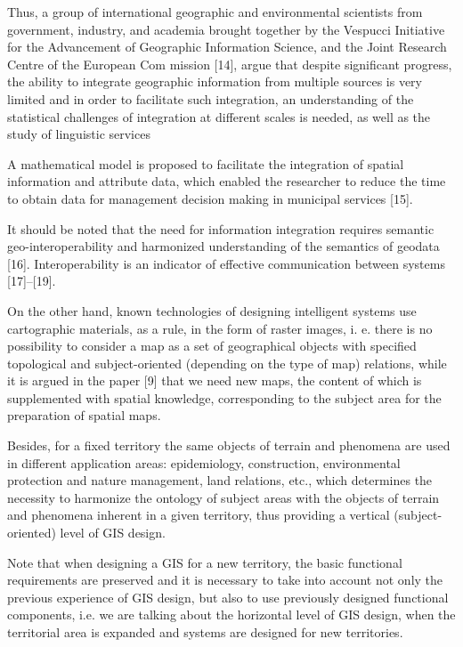 \documentclass[10pt, letterpaper, twoside]{article}
\begin{document}
\begin{multicols}{2}
Thus, a group of international geographic and environmental scientists from government, industry, and
academia brought together by the Vespucci Initiative for
the Advancement of Geographic Information Science,
and the Joint Research Centre of the European Com
mission [14], argue that despite significant progress, the
ability to integrate geographic information from multiple
sources is very limited and in order to facilitate such
integration, an understanding of the statistical challenges
of integration at different scales is needed, as well as the
study of linguistic services

A mathematical model is proposed to facilitate the
integration of spatial information and attribute data,
which enabled the researcher to reduce the time to obtain data for management decision making in municipal
services [15].

It should be noted that the need for information integration requires semantic geo-interoperability and harmonized understanding of the semantics of geodata [16].
Interoperability is an indicator of effective communication between systems [17]–[19].

On the other hand, known technologies of designing
intelligent systems use cartographic materials, as a rule,
in the form of raster images, i. e. there is no possibility
to consider a map as a set of geographical objects with
specified topological and subject-oriented (depending on
the type of map) relations, while it is argued in the
paper [9] that we need new maps, the content of which
is supplemented with spatial knowledge, corresponding
to the subject area for the preparation of spatial maps.

Besides, for a fixed territory the same objects of
terrain and phenomena are used in different application
areas: epidemiology, construction, environmental protection and nature management, land relations, etc., which
determines the necessity to harmonize the ontology of
subject areas with the objects of terrain and phenomena
inherent in a given territory, thus providing a vertical
(subject-oriented) level of GIS design.

Note that when designing a GIS for a new territory,
the basic functional requirements are preserved and it
is necessary to take into account not only the previous
experience of GIS design, but also to use previously
designed functional components, i.e. we are talking
about the horizontal level of GIS design, when the
territorial area is expanded and systems are designed for
new territories.


\end{multicols}
\end{document}
